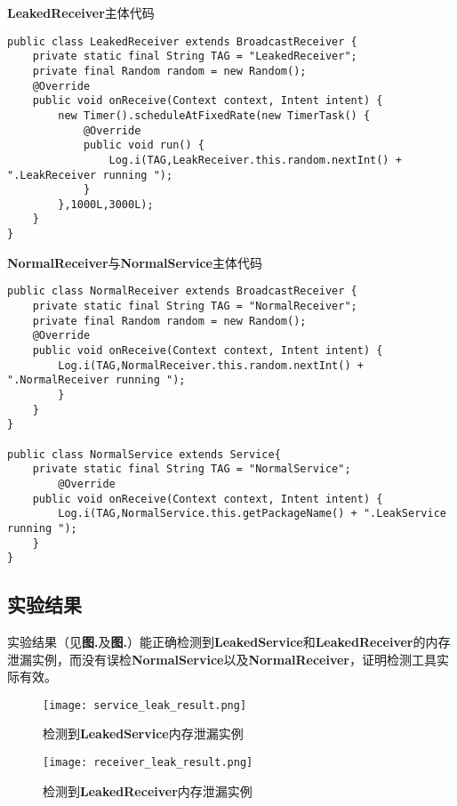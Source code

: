 \begin{listing}[htbp]
	\centering
	\caption{\textbf{LeakedReceiver}主体代码}
	\begin{verbatim}
public class LeakedReceiver extends BroadcastReceiver {
	private static final String TAG = "LeakedReceiver";
	private final Random random = new Random();
	@Override
	public void onReceive(Context context, Intent intent) {
		new Timer().scheduleAtFixedRate(new TimerTask() {
			@Override
			public void run() {
				Log.i(TAG,LeakReceiver.this.random.nextInt() + ".LeakReceiver running ");
			}
		},1000L,3000L);
	}
}
	\end{verbatim}
	\label{code:LeakedReceiver}
\end{listing}

\begin{listing}[htbp]
	\centering
	\caption{\textbf{NormalReceiver}与\textbf{NormalService}主体代码}
	\begin{verbatim}
public class NormalReceiver extends BroadcastReceiver {
	private static final String TAG = "NormalReceiver";
	private final Random random = new Random();
	@Override
	public void onReceive(Context context, Intent intent) {
		Log.i(TAG,NormalReceiver.this.random.nextInt() + ".NormalReceiver running ");
		}
	}
}

public class NormalService extends Service{
	private static final String TAG = "NormalService";
		@Override
	public void onReceive(Context context, Intent intent) {
		Log.i(TAG,NormalService.this.getPackageName() + ".LeakService running ");
	}
}
	\end{verbatim}
	\label{code:Normal}
\end{listing}
\subsection{实验结果}
实验结果（见\textbf{图.}\redbf{\ref{fig:result of mock receiver}}及\textbf{图.}\redbf{\ref{fig:result of mock service}}）能正确检测到\textbf{LeakedService}和\textbf{LeakedReceiver}的内存泄漏实例，而没有误检\textbf{NormalService}以及\textbf{NormalReceiver}，证明检测工具实际有效。

\begin{figure}[htbp]
	\centering
	\texttt{[image: service\_leak\_result.png]} %
	\caption{检测到\textbf{LeakedService}内存泄漏实例}
	\label{fig:result of mock service}
\end{figure}
\begin{figure}[htbp]
\centering
\texttt{[image: receiver\_leak\_result.png]} %
\caption{检测到\textbf{LeakedReceiver}内存泄漏实例}
\label{fig:result of mock receiver}
\end{figure}

